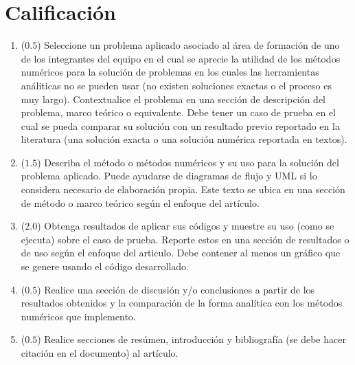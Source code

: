 \documentclass[12pt]{article}
\begin{document}
\section{Calificación}
  \begin{enumerate}[leftmargin=*,widest=9]
    \item (\(0.5\)) Seleccione un problema aplicado asociado al área de formación de uno de los integrantes del equipo en el cual se aprecie la utilidad de los métodos numéricos para la solución de problemas en los cuales las herramientas análiticas no se pueden usar (no existen soluciones exactas o el proceso es muy largo). Contextualice el problema en una sección de descripción del problema, marco teórico o equivalente. Debe tener un caso de prueba en el cual se pueda comparar su solución con un resultado previo reportado en la literatura (una solución exacta o una solución numérica reportada en textos).
		\item (\(1.5\)) Describa el método o métodos numéricos y su uso para la solución del problema aplicado. Puede ayudarse de diagramas de flujo y UML si lo considera necesario de elaboración propia. Este texto se ubica en una sección de método o marco teórico según el enfoque del artículo.
		\item (\(2.0\)) Obtenga resultados de aplicar sus códigos y muestre su uso (como se ejecuta) sobre el caso de prueba. Reporte estos en una sección de resultados o de uso según el enfoque del articulo. Debe contener al menos un gráfico que se genere usando el código desarrollado.
		\item (\(0.5\)) Realice una sección de discusión y/o conclusiones a partir de los resultados obtenidos y la comparación de la forma analítica con los métodos numéricos que implemento.
		\item (\(0.5\)) Realice secciones de resúmen, introducción y bibliografía (se debe hacer citación en el documento) al artículo.
\end{enumerate}
\end{document}
